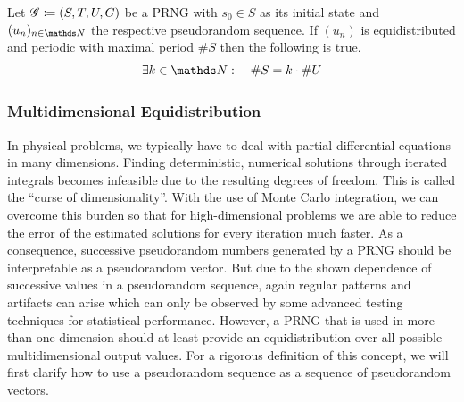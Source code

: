 \documentclass{stdlocal}
\begin{document}
  \begin{corollary}
    Let $\mathscr{G}\coloneqq (S,T,U,G)$ be a PRNG with $s_0\in S$ as its initial state and $(u_n)_{n\in\setNatural}$ the respective pseudorandom sequence.
    If $(u_n)$ is equidistributed and periodic with maximal period $\# S$ then the following is true.
    \[
      \exists k\in\setNatural:\quad \# S = k \cdot \# U
    \]
  \end{corollary}


  \subsubsection{Multidimensional Equidistribution}
  In physical problems, we typically have to deal with partial differential equations in many dimensions.
  Finding deterministic, numerical solutions through iterated integrals becomes infeasible due to the resulting degrees of freedom.
  This is called the \enquote{curse of dimensionality}.
  With the use of Monte Carlo integration, we can overcome this burden so that for high-dimensional problems we are able to reduce the error of the estimated solutions for every iteration much faster.
  As a consequence, successive pseudorandom numbers generated by a PRNG should be interpretable as a pseudorandom vector.
  But due to the shown dependence of successive values in a pseudorandom sequence, again regular patterns and artifacts can arise which can only be observed by some advanced testing techniques for statistical performance.
  However, a PRNG that is used in more than one dimension should at least provide an equidistribution over all possible multidimensional output values.
  For a rigorous definition of this concept, we will first clarify how to use a pseudorandom sequence as a sequence of pseudorandom vectors.
\end{document}
